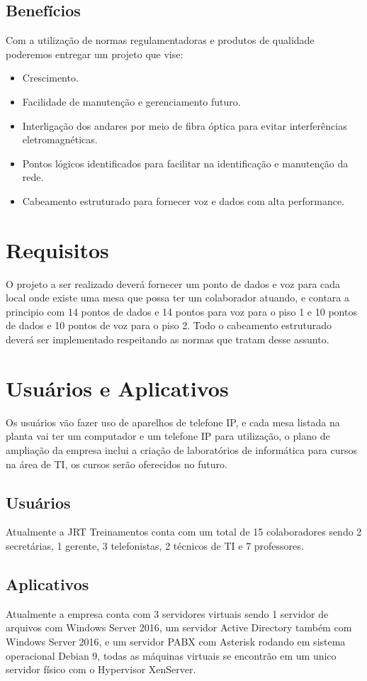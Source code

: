 \documentclass[	DIV=calc,%
							paper=a4,%
							fontsize=12pt,%
							onecolumn]{scrartcl}	 					%
\begin{document}
\subsection{Benefícios}

Com a utilização de normas regulamentadoras e produtos de qualidade poderemos entregar um projeto que vise:
\begin{itemize}
	\item Crescimento.
	\item Facilidade de manutenção e gerenciamento futuro.
	\item Interligação dos andares por meio de fibra óptica para evitar interferências eletromagnéticas.
	\item Pontos lógicos identificados para facilitar na identificação e manutenção da rede.
	\item Cabeamento estruturado para fornecer voz e dados com alta performance.
\end{itemize}

\section{Requisitos}
O projeto a ser realizado deverá fornecer um ponto de dados e voz para cada local onde existe uma mesa que possa ter um colaborador atuando, e contara a principio com 14 pontos de dados e 14 pontos para voz para o piso 1 e 10 pontos de dados e 10 pontos de voz para o piso 2.\newline
Todo o cabeamento estruturado deverá ser implementado respeitando as normas que tratam desse assunto.

\section{Usuários e Aplicativos}
Os usuários vão fazer uso de aparelhos de telefone IP, e cada mesa listada na planta vai ter um computador e um telefone IP para utilização, o plano de ampliação da empresa inclui a criação de laboratórios de informática para cursos na área de TI, os cursos serão oferecidos no futuro.
 

\subsection{Usuários}
Atualmente a JRT Treinamentos conta com um total de 15 colaboradores sendo 2 secretárias, 1 gerente, 3 telefonistas, 2 técnicos de TI e 7 professores.

\subsection{Aplicativos}
Atualmente a empresa conta com 3 servidores virtuais sendo 1 servidor de arquivos com Windows Server 2016, um servidor Active Directory também com Windows Server 2016, e um servidor PABX com Asterisk rodando em sistema operacional Debian 9, todas as máquinas virtuais se encontrão em um unico servidor físico com o Hypervisor XenServer.
\end{document}
